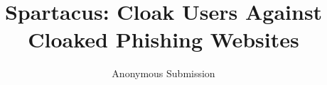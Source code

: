 \documentclass[conference]{IEEEtran}
\newcommand{\crawlphish}{{CrawlPhish}\xspace}
\newcommand{\spartacus}{{Spartacus}\xspace}
\begin{document}



\title{\spartacus: Cloak Users Against Cloaked Phishing Websites}

\author{Anonymous Submission}


\maketitle

\thispagestyle{plain}
\pagestyle{plain}



\begin{abstract}
	
\end{abstract}














% 
\end{document}
